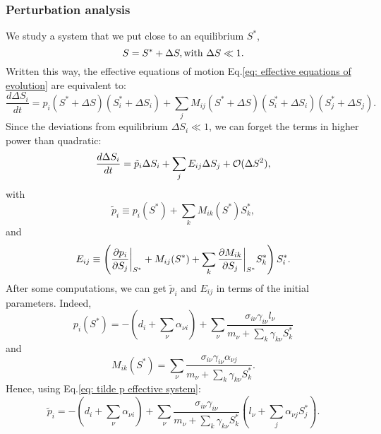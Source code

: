 \documentclass[12pt, titlepage, twoside, openright]{report}
\begin{document}
\subsubsection{Perturbation analysis}
We study a system that we put close to an equilibrium $S^*$, \ie
\begin{equation}
S=S^*+\Delta S, \\ \text{with } \Delta S \ll 1.
\end{equation}
Written this way, the effective equations of motion Eq.\eqref{eq: effective equations of evolution} are equivalent to:
\begin{equation}
\frac{d\Delta S_i}{dt} = p_i(S^*+\Delta S)\left(S^*_i + \Delta S_i\right)+\sum_j M_{ij}(S^*+\Delta S)\left(S^*_i +\Delta S_i\right)\left(S^*_j +\Delta S_j\right).
\end{equation}
Since the deviations from equilibrium $\Delta S_i \ll 1$, we can forget the terms in higher power than quadratic:
\begin{equation}
\frac{d\Delta S_i}{dt} = \tilde{p}_i \Delta S_i + \sum_j E_{ij} \Delta S_j + \mathcal{O}(\Delta S^2),\label{eq: effective equ evol at O(D2)}
\end{equation}
with
\begin{equation}
\tilde{p}_i \equiv p_i(S^*) + \sum_k M_{ik}(S^*)S_k^*, \label{eq: tilde p effective system}
\end{equation}
and
\begin{equation}
E_{ij} \equiv \left(\dfrac{\partial p_i}{\partial S_j}\bigg\rvert_{S^*}+M_{ij}(S^*)+\sum_k \dfrac{\partial M_{ik}}{\partial S_j}\bigg\rvert_{S^*}S^*_k\right)S^*_i.
\end{equation}
After some computations, we can get $\tilde{p}_i$ and $E_{ij}$ in terms of the initial parameters. Indeed,
\begin{equation}
p_i(S^*)= -\left(d_i + \sum_\nu \alpha_{\nu i}\right) + \sum_\nu \frac{\sigma_{i\nu}\gamma_{i\nu}l_\nu}{m_\nu + \sum_k \gamma_{k\nu}S^*_k}
\end{equation}
and
\begin{equation}
M_{ik}(S^*) = \sum_\nu \frac{\sigma_{i\nu}\gamma_{i\nu}\alpha_{\nu j}}{m_\nu + \sum_k \gamma_{k\nu}S^*_k}.
\end{equation}
Hence, using Eq.\eqref{eq: tilde p effective system}:
\begin{equation}
\tilde{p}_i = - \left(d_i + \sum_\nu \alpha_{\nu i}\right) + \sum_\nu \frac{\sigma_{i\nu}\gamma_{i\nu}}{m_\nu + \sum_k \gamma_{k\nu}S^*_k}\left(l_\nu+\sum_{j}\alpha_{\nu j} S^*_j\right).
\end{equation}
\end{document}
